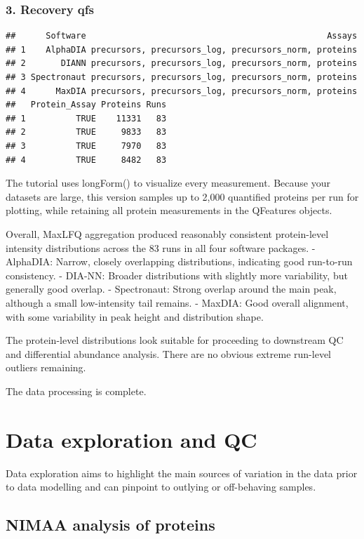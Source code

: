 \documentclass[
  10pt,
]{article}
\begin{document}
\subsubsection{3. Recovery qfs}\label{recovery-qfs-2}

\begin{verbatim}
##      Software                                                Assays
## 1    AlphaDIA precursors, precursors_log, precursors_norm, proteins
## 2       DIANN precursors, precursors_log, precursors_norm, proteins
## 3 Spectronaut precursors, precursors_log, precursors_norm, proteins
## 4      MaxDIA precursors, precursors_log, precursors_norm, proteins
##   Protein_Assay Proteins Runs
## 1          TRUE    11331   83
## 2          TRUE     9833   83
## 3          TRUE     7970   83
## 4          TRUE     8482   83
\end{verbatim}

The tutorial uses longForm() to visualize every measurement. Because
your datasets are large, this version samples up to 2,000 quantified
proteins per run for plotting, while retaining all protein measurements
in the QFeatures objects.

Overall, MaxLFQ aggregation produced reasonably consistent protein-level
intensity distributions across the 83 runs in all four software
packages. - AlphaDIA: Narrow, closely overlapping distributions,
indicating good run-to-run consistency. - DIA-NN: Broader distributions
with slightly more variability, but generally good overlap. -
Spectronaut: Strong overlap around the main peak, although a small
low-intensity tail remains. - MaxDIA: Good overall alignment, with some
variability in peak height and distribution shape.

The protein-level distributions look suitable for proceeding to
downstream QC and differential abundance analysis. There are no obvious
extreme run-level outliers remaining.

The data processing is complete.

\section{Data exploration and QC}\label{data-exploration-and-qc}

Data exploration aims to highlight the main sources of variation in the
data prior to data modelling and can pinpoint to outlying or
off-behaving samples.

\subsection{NIMAA analysis of
proteins}\label{nimaa-analysis-of-proteins}
\end{document}
